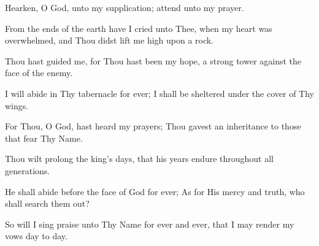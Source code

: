 Hearken, O God, unto my supplication; attend unto my prayer.

From the ends of the earth have I cried unto Thee, when my heart was overwhelmed, and Thou didst lift me high upon a rock.

Thou hast guided me, for Thou hast been my hope, a strong tower against the face of the enemy.

I will abide in Thy tabernacle for ever; I shall be sheltered under the cover of Thy wings.

For Thou, O God, hast heard my prayers; Thou gavest an inheritance to those that fear Thy Name.

Thou wilt prolong the king’s days, that his years endure throughout all generations.

He shall abide before the face of God for ever; As for His mercy and truth, who shall search them out?

So will I sing praise unto Thy Name for ever and ever, that I may render my vows day to day.
